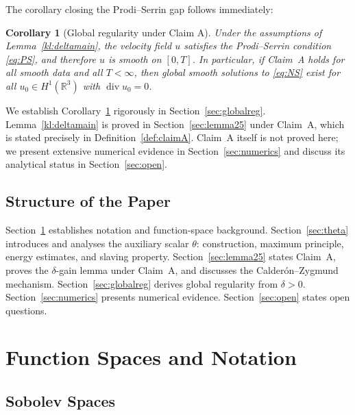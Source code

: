 \documentclass[12pt]{article}
\newtheorem{corollary}[theorem]{Corollary}
\theoremstyle{definition}
\newcommand{\R}{\mathbb{R}}
\newcommand{\dive}{\operatorname{div}}
\begin{document}
The corollary closing the Prodi--Serrin gap follows immediately:

\begin{corollary}[Global regularity under Claim A]
\label{cor:globalreg}
Under the assumptions of Lemma~\textup{\ref{kl:deltamain}},
the velocity field $u$ satisfies the Prodi--Serrin condition
\eqref{eq:PS}, and therefore $u$ is smooth on $[0,T]$.
In particular, if Claim~A holds for all smooth data and all $T < \infty$,
then global smooth solutions to \eqref{eq:NS} exist for all $u_0 \in H^1(\R^3)$
with $\dive u_0 = 0$.
\end{corollary}

We establish Corollary~\ref{cor:globalreg} rigorously in
Section~\ref{sec:globalreg}. Lemma~\ref{kl:deltamain} is proved in
Section~\ref{sec:lemma25} under Claim~A, which is stated precisely in
Definition~\ref{def:claimA}. Claim~A itself is not proved here; we present
extensive numerical evidence in Section~\ref{sec:numerics} and discuss its
analytical status in Section~\ref{sec:open}.

\subsection{Structure of the Paper}
\label{subsec:structure}

Section~\ref{sec:notation} establishes notation and function-space background.
Section~\ref{sec:theta} introduces and analyses the auxiliary scalar $\theta$:
construction, maximum principle, energy estimates, and slaving property.
Section~\ref{sec:lemma25} states Claim~A, proves the $\delta$-gain lemma
under Claim~A, and discusses the Calder\'{o}n--Zygmund mechanism.
Section~\ref{sec:globalreg} derives global regularity from $\delta > 0$.
Section~\ref{sec:numerics} presents numerical evidence.
Section~\ref{sec:open} states open questions.

\section{Function Spaces and Notation}
\label{sec:notation}

\subsection{Sobolev Spaces}
\label{subsec:sobolev}
\end{document}
